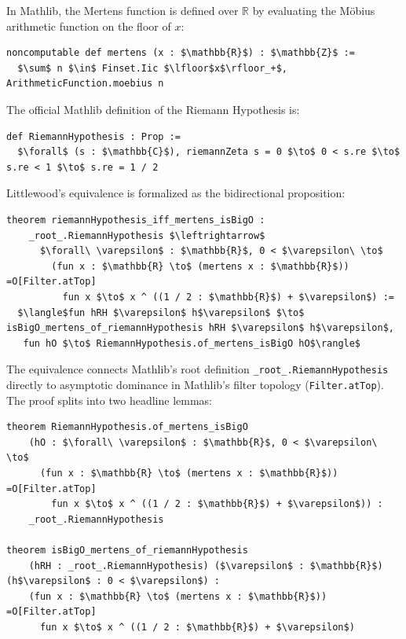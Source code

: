 \documentclass[11pt,a4paper]{article}
\theoremstyle{definition}
\newcommand{\Rset}{\mathbb{R}}
\begin{document}
In Mathlib, the Mertens function is defined over $\Rset$ by evaluating the M\"obius arithmetic function on the floor of $x$:
\begin{lstlisting}
noncomputable def mertens (x : $\mathbb{R}$) : $\mathbb{Z}$ :=
  $\sum$ n $\in$ Finset.Iic $\lfloor$x$\rfloor_+$, ArithmeticFunction.moebius n
\end{lstlisting}
The official Mathlib definition of the Riemann Hypothesis is:
\begin{lstlisting}
def RiemannHypothesis : Prop :=
  $\forall$ (s : $\mathbb{C}$), riemannZeta s = 0 $\to$ 0 < s.re $\to$ s.re < 1 $\to$ s.re = 1 / 2
\end{lstlisting}

Littlewood's equivalence is formalized as the bidirectional proposition:
\begin{lstlisting}
theorem riemannHypothesis_iff_mertens_isBigO :
    _root_.RiemannHypothesis $\leftrightarrow$
      $\forall\ \varepsilon$ : $\mathbb{R}$, 0 < $\varepsilon\ \to$
        (fun x : $\mathbb{R} \to$ (mertens x : $\mathbb{R}$)) =O[Filter.atTop]
          fun x $\to$ x ^ ((1 / 2 : $\mathbb{R}$) + $\varepsilon$) :=
  $\langle$fun hRH $\varepsilon$ h$\varepsilon$ $\to$ isBigO_mertens_of_riemannHypothesis hRH $\varepsilon$ h$\varepsilon$,
   fun hO $\to$ RiemannHypothesis.of_mertens_isBigO hO$\rangle$
\end{lstlisting}

The equivalence connects Mathlib's root definition \texttt{\_root\_.RiemannHypothesis} directly to asymptotic dominance in Mathlib's filter topology (\texttt{Filter.atTop}). The proof splits into two headline lemmas:
\begin{lstlisting}
theorem RiemannHypothesis.of_mertens_isBigO
    (hO : $\forall\ \varepsilon$ : $\mathbb{R}$, 0 < $\varepsilon\ \to$
      (fun x : $\mathbb{R} \to$ (mertens x : $\mathbb{R}$)) =O[Filter.atTop]
        fun x $\to$ x ^ ((1 / 2 : $\mathbb{R}$) + $\varepsilon$)) :
    _root_.RiemannHypothesis

theorem isBigO_mertens_of_riemannHypothesis
    (hRH : _root_.RiemannHypothesis) ($\varepsilon$ : $\mathbb{R}$) (h$\varepsilon$ : 0 < $\varepsilon$) :
    (fun x : $\mathbb{R} \to$ (mertens x : $\mathbb{R}$)) =O[Filter.atTop]
      fun x $\to$ x ^ ((1 / 2 : $\mathbb{R}$) + $\varepsilon$)
\end{lstlisting}

\end{document}
